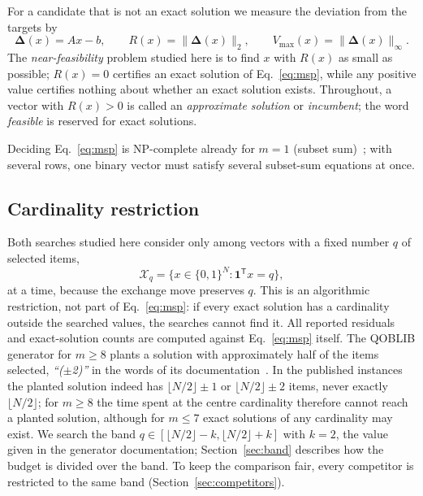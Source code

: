 \documentclass[pdflatex,sn-mathphys-num]{sn-jnl}
\theoremstyle{thmstyleone}
\theoremstyle{thmstylethree}
\newcommand{\B}{\{0,1\}}
\newcommand{\res}{\boldsymbol{\Delta}}
\begin{document}
For a candidate that is not an exact solution we measure the deviation from the targets by
\begin{equation}
  \res(x)=Ax-b,\qquad R(x)=\|\res(x)\|_2,\qquad V_{\max}(x)=\|\res(x)\|_\infty. \label{eq:residual}
\end{equation}
The \emph{near-feasibility} problem studied here is to find $x$ with $R(x)$ as small as possible; $R(x)=0$ certifies an exact solution of Eq.~\eqref{eq:msp}, while any positive value certifies nothing about whether an exact solution exists. Throughout, a vector with $R(x)>0$ is called an \emph{approximate solution} or \emph{incumbent}; the word \emph{feasible} is reserved for exact solutions.

Deciding Eq.~\eqref{eq:msp} is NP-complete already for $m=1$ (subset sum)~\cite{cornuejols1998}; with several rows, one binary vector must satisfy several subset-sum equations at once.

\subsection{Cardinality restriction}
Both searches studied here consider only among vectors with a fixed number $q$ of selected items,
\begin{equation}
  \mathcal X_q=\{x\in\B^N:\mathbf 1^{\mathsf T}x=q\}, \label{eq:cardinality}
\end{equation}
at a time, because the exchange move preserves $q$. This is an algorithmic restriction, not part of Eq.~\eqref{eq:msp}: if every exact solution has a cardinality outside the searched values, the searches cannot find it. All reported residuals and exact-solution counts are computed against Eq.~\eqref{eq:msp} itself. The QOBLIB generator for $m\ge8$ plants a solution with approximately half of the items selected, \emph{``(\(\pm\)2)''} in the words of its documentation~\cite{koch2025}. In the published instances the planted solution indeed has $\lfloor N/2\rfloor\pm1$ or $\lfloor N/2\rfloor\pm2$ items, never exactly $\lfloor N/2\rfloor$; for $m\ge8$ the time spent at the centre cardinality therefore cannot reach a planted solution, although for $m\le7$ exact solutions of any cardinality may exist. We search the band $q\in[\lfloor N/2\rfloor-k,\lfloor N/2\rfloor+k]$ with $k=2$, the value given in the generator documentation; Section~\ref{sec:band} describes how the budget is divided over the band. To keep the comparison fair, every competitor is restricted to the same band (Section~\ref{sec:competitors}).
\end{document}
